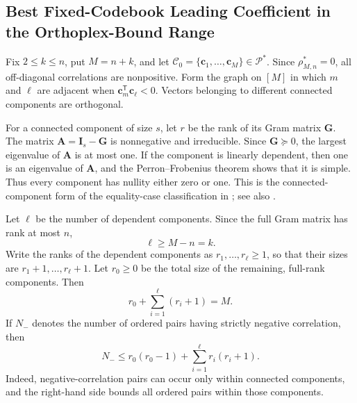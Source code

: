 \documentclass[12pt,draftclsnofoot,onecolumn]{IEEEtran}
\newcommand{\cC}{\mathcal{C}}
\newcommand{\cP}{\mathcal{P}}
\newcommand{\bc}{\bm c}
\newcommand{\bA}{\mathbf A}
\newcommand{\bG}{\mathbf G}
\newcommand{\bI}{\mathbf I}
\theoremstyle{definition}
\begin{document}
\subsection{Best Fixed-Codebook Leading Coefficient in the Orthoplex-Bound Range}

\begin{IEEEproof}
Fix \(2\leq k\leq n\), put \(M=n+k\), and let
\(\cC_0=\{\bc_1,\ldots,\bc_M\}\in\cP^{\ast}\).  Since
\(\rho^{\ast}_{M,n}=0\), all off-diagonal correlations are
nonpositive.  Form the graph on \([M]\) in which \(m\) and \(\ell\)
are adjacent when \(\bc_m^{\mathsf T}\bc_\ell<0\).  Vectors belonging
to different connected components are orthogonal.

For a connected component of size \(s\), let \(r\) be the rank of its
Gram matrix \(\bG\).  The matrix \(\bA=\bI_s-\bG\) is nonnegative and
irreducible.  Since \(\bG\succeq0\), the largest eigenvalue of \(\bA\) is
at most one.  If the component is linearly dependent, then one is an
eigenvalue of \(\bA\), and the Perron--Frobenius theorem shows that it is
simple.  Thus every component has nullity either zero or one.  This is
the connected-component form of the equality-case classification in
\cite[Thm.~3]{Kuperberg2007}; see also
\cite[Thm.~2.2]{KingMixonParshallWells2026}.

Let \(\ell\) be the number of dependent components.  Since the full
Gram matrix has rank at most \(n\),
\[
  \ell\geq M-n=k.
\]
Write the ranks of the dependent components as
\(r_1,\ldots,r_\ell\geq1\), so that their sizes are
\(r_1+1,\ldots,r_\ell+1\).  Let \(r_0\geq0\) be the total size of the
remaining, full-rank components.  Then
\begin{equation*}
  r_0+\sum_{i=1}^{\ell}(r_i+1)=M.
\end{equation*}
If \(N_-\) denotes the number of ordered pairs having strictly
negative correlation, then
\begin{equation*}
  N_-
  \leq r_0(r_0-1)+\sum_{i=1}^{\ell}r_i(r_i+1).
\end{equation*}
Indeed, negative-correlation pairs can occur only within connected
components, and the right-hand side bounds all ordered pairs within
those components.


\end{IEEEproof}
\end{document}
